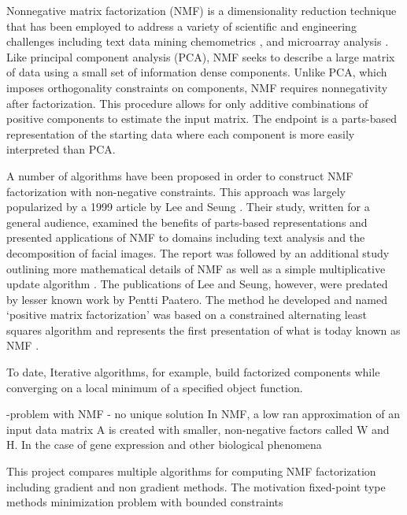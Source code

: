\documentclass[final,leqno,onefignum,onetabnum]{siamltex1213}
\begin{document}
Nonnegative matrix factorization (NMF) is a dimensionality reduction technique that  has been employed to address a variety of scientific and engineering challenges including text data mining \cite{Pau,Lan,LeSe1} chemometrics \cite{Paa1,Paa2}, and microarray analysis \cite{Bur}. Like principal component analysis (PCA), NMF seeks to describe a large matrix of data using a small set of information dense components. Unlike PCA, which imposes orthogonality constraints on components, NMF requires nonnegativity after factorization. This procedure allows for only additive combinations of positive components to estimate the input matrix. The endpoint is a parts-based representation of the starting data where each component is more easily interpreted than PCA. 

A number of algorithms have been proposed in order to construct NMF factorization with non-negative constraints. This approach was largely popularized by a 1999 article by Lee and Seung \cite{LeSe1}. Their study, written for a general audience, examined the benefits of parts-based representations and presented applications of NMF to domains including text analysis and the decomposition of facial images. The report was followed by an additional study outlining more mathematical details of NMF as well as a simple multiplicative update algorithm \cite{LeSe2}. The publications of Lee and Seung, however, were predated by lesser known work by Pentti Paatero. The method he developed and named `positive matrix factorization' was based on a constrained alternating least squares algorithm and represents the first presentation of what is today known as NMF \cite{Paa1,Paa2}. 



To date, 
Iterative algorithms, for example, build factorized components while converging on a local minimum of a specified object function. 

-problem with NMF - no unique solution 
In NMF, a low ran approximation of an input data matrix A is created with smaller, non-negative factors called W and H. 
In the case of gene expression and other biological phenomena 

This project compares multiple algorithms for computing NMF factorization including gradient and non gradient methods. The motivation 
fixed-point type methods 
minimization problem with bounded constraints 
\end{document}

